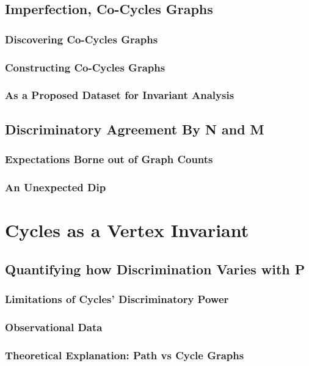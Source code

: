 \documentclass[11pt,a4paper]{report}
\begin{document}
\section{Imperfection, Co-Cycles Graphs}
\subsection{Discovering Co-Cycles Graphs}
\subsection{Constructing Co-Cycles Graphs}
\subsection{As a Proposed Dataset for Invariant Analysis}

\section{Discriminatory Agreement By N and M}
\subsection{Expectations Borne out of Graph Counts}
\subsection{An Unexpected Dip}




\chapter{Cycles as a Vertex Invariant}

\section{Quantifying how Discrimination Varies with P}
\subsection{Limitations of Cycles' Discriminatory Power}
\subsection{Observational Data}
\subsection{Theoretical Explanation: Path vs Cycle Graphs}
\end{document}
